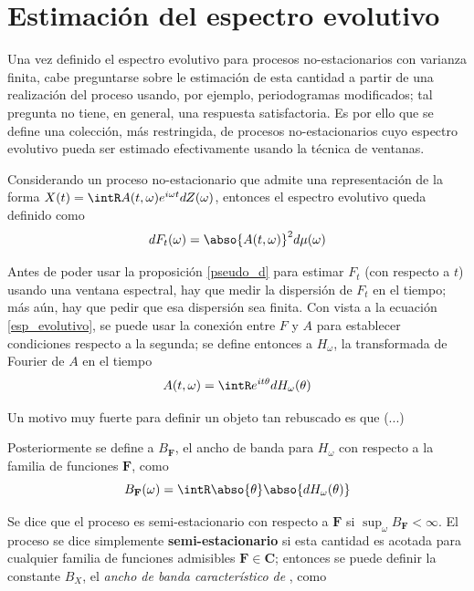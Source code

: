 
\section{Estimación del espectro evolutivo}

Una vez definido el espectro evolutivo para procesos no-estacionarios con varianza finita, cabe 
preguntarse sobre le estimación de esta cantidad a partir de una realización del proceso usando, 
por ejemplo, periodogramas modificados; tal pregunta no tiene, en general, una respuesta 
satisfactoria.
Es por ello que se define una colección, más restringida, de procesos no-estacionarios cuyo 
espectro evolutivo pueda ser estimado efectivamente usando la técnica de ventanas.

Considerando un proceso no-estacionario \xt que admite una representación de la forma 
$X(t) = \intR A(t,\omega) e^{i \omega t} dZ(\omega)$, entonces el espectro evolutivo queda definido 
como
\begin{equation}
dF_t(\omega) = \abso{A(t,\omega)}^{2} d\mu(\omega)
\label{esp_evolutivo}
\end{equation}

Antes de poder usar la proposición \ref{pseudo_d} para estimar $F_t$ (con respecto a $t$) usando 
una ventana espectral, hay que medir la dispersión de $F_t$ en el tiempo; más aún, hay que pedir 
que esa dispersión sea finita.
Con vista a la ecuación \ref{esp_evolutivo}, se puede usar la conexión entre $F$ y $A$ para 
establecer condiciones respecto a la segunda; se define entonces a $H_\omega$, la transformada de
Fourier de $A$ en el tiempo
\begin{equation}
A(t,\omega) = \intR e^{i t \theta} dH_\omega(\theta)
\end{equation}

Un motivo muy fuerte para definir un objeto tan rebuscado es que (...)

Posteriormente se define a $B_{\mathbf{F}}$, el ancho de banda para $H_\omega$ con respecto a la 
familia de funciones $\mathbf{F}$, como
%
\begin{equation}
B_{\mathbf{F}}(\omega) = \intR \abso{\theta} \abso{dH_\omega(\theta)}
\end{equation}

Se dice que el proceso es semi-estacionario con respecto a $\mathbf{F}$ si 
$\sup_\omega B_{\mathbf{F}} < \infty$. El proceso se dice simplemente \textbf{semi-estacionario} 
si esta cantidad es acotada para cualquier familia de funciones admisibles 
$\mathbf{F} \in \mathbf{C}$; entonces se puede definir la constante $B_X$, el \textit{ancho de 
banda característico de} \xt, como


